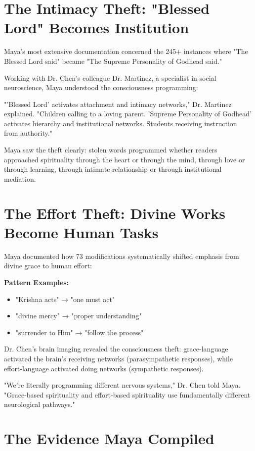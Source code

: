 \documentclass[11pt,twoside]{book}
\begin{document}
\section*{The Intimacy Theft: "Blessed Lord" Becomes Institution}
\label{sec:orgb4e0a15}

Maya's most extensive documentation concerned the 245+ instances where "The Blessed Lord said" became "The Supreme Personality of Godhead said."

Working with Dr. Chen's colleague Dr. Martinez, a specialist in social neuroscience, Maya understood the consciousness programming:

"'Blessed Lord' activates attachment and intimacy networks," Dr. Martinez explained. "Children calling to a loving parent. 'Supreme Personality of Godhead' activates hierarchy and institutional networks. Students receiving instruction from authority."

Maya saw the theft clearly: stolen words programmed whether readers approached spirituality through the heart or through the mind, through love or through learning, through intimate relationship or through institutional mediation.
\section*{The Effort Theft: Divine Works Become Human Tasks}
\label{sec:orgd3c6e8e}

Maya documented how 73 modifications systematically shifted emphasis from divine grace to human effort:

\textbf{\textbf{Pattern Examples:}}
\begin{itemize}
\item "Krishna acts" → "one must act"
\item "divine mercy" → "proper understanding"
\item "surrender to Him" → "follow the process"
\end{itemize}

Dr. Chen's brain imaging revealed the consciousness theft: grace-language activated the brain's receiving networks (parasympathetic responses), while effort-language activated doing networks (sympathetic responses).

"We're literally programming different nervous systems," Dr. Chen told Maya. "Grace-based spirituality and effort-based spirituality use fundamentally different neurological pathways."
\section*{The Evidence Maya Compiled}
\label{sec:org4bfc9db}
\end{document}
